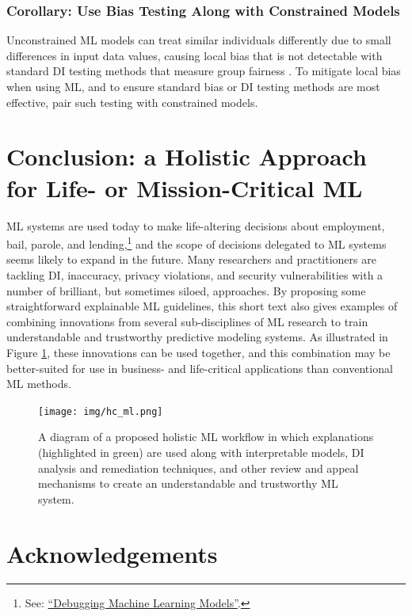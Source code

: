 \documentclass{article}
\begin{document}
\subsubsection{Corollary: Use Bias Testing Along with Constrained Models} \label{cor:di_con}

Unconstrained ML models can treat similar individuals differently due to small differences in input data values, causing local bias that is not detectable with standard DI testing methods that measure group fairness \cite{dwork2012fairness}. To mitigate local bias when using ML, and to ensure standard bias or DI testing methods are most effective, pair such testing with constrained models.

\section{Conclusion: a Holistic Approach for Life- or Mission-Critical ML} \label{sec:conclusion}

ML systems are used today to make life-altering decisions about employment, bail, parole, and lending,\footnote{\scriptsize{See: \href{https://debug-ml-iclr2019.github.io/}{``Debugging Machine Learning Models''}.}} and the scope of decisions delegated to ML systems seems likely to expand in the future. Many researchers and practitioners are tackling DI, inaccuracy, privacy violations, and security vulnerabilities with a number of brilliant, but sometimes siloed, approaches. By proposing some straightforward explainable ML guidelines, this short text also gives examples of combining innovations from several sub-disciplines of ML research to train understandable and trustworthy predictive modeling systems. As illustrated in Figure \ref{fig:hc_ml}, these innovations can be used together, and this combination may be better-suited for use in business- and life-critical applications than conventional ML methods.

\begin{figure}[htb!]
	\begin{center}
		\texttt{[image: img/hc\_ml.png]}
		\caption{A diagram of a proposed holistic ML workflow in which explanations (highlighted in green) are used along with interpretable models, DI analysis and remediation techniques, and other review and appeal mechanisms to create an understandable and trustworthy ML system.}
		\label{fig:hc_ml}
	\end{center}
\end{figure}

\clearpage
\section*{Acknowledgements}
\end{document}
